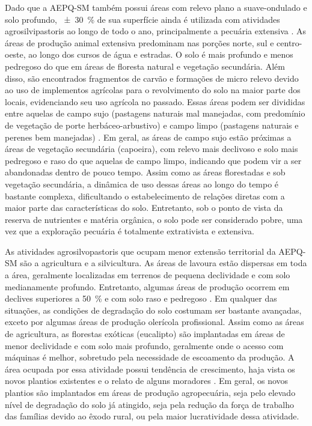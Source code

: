 Dado que a AEPQ-SM também possui áreas com relevo plano a suave-ondulado e solo profundo, 
\SI{\pm30}{\percent} de sua superfície ainda é utilizada com atividades agrosilvipastoris ao longo 
de todo o ano, principalmente a pecuária extensiva \citep{SamuelRosaEtAl2011a}. As áreas de produção
animal extensiva predominam nas porções norte, sul e centro-oeste, ao longo dos cursos de água e 
estradas. O solo é mais profundo e menos pedregoso do que em áreas de floresta natural e vegetação 
secundária. Além disso, são encontrados fragmentos de carvão e formações de micro relevo devido ao 
uso de implementos agrícolas para o revolvimento do solo na maior parte dos locais, evidenciando seu
uso agrícola no passado. Essas áreas podem ser divididas entre aquelas de campo sujo (pastagens 
naturais mal manejadas, com predomínio de vegetação de porte herbáceo-arbustivo) e campo limpo 
(pastagens naturais e perenes bem manejadas) \citep{SamuelRosaEtAl2011a}. Em geral, as áreas de 
campo sujo estão próximas a áreas de vegetação secundária (capoeira), com relevo mais declivoso e 
solo mais pedregoso e raso do que aquelas de campo limpo, indicando que podem vir a ser abandonadas 
dentro de pouco tempo. Assim como as áreas florestadas e sob vegetação secundária, a dinâmica de uso
dessas áreas ao longo do tempo é bastante complexa, dificultando o estabelecimento de relações 
diretas com a maior parte das características do solo. Entretanto, sob o ponto de vista da reserva 
de nutrientes e matéria orgânica, o solo pode ser considerado pobre, uma vez que a exploração 
pecuária é totalmente extrativista e extensiva.


As atividades agrosilvopastoris que ocupam menor extensão territorial da AEPQ-SM são a agricultura e
a silvicultura. As áreas de lavoura estão dispersas em toda a área, geralmente localizadas em 
terrenos de pequena declividade e com solo medianamente profundo. Entretanto, algumas áreas de 
produção ocorrem em declives superiores a \SI{50}{\percent} e com solo raso e pedregoso 
\citep{SamuelRosaEtAl2011a}. Em qualquer das situações, as condições de degradação do solo costumam 
ser bastante avançadas, exceto por algumas áreas de produção olerícola profissional. Assim como as 
áreas de agricultura, as florestas exóticas (eucalipto) são implantadas em áreas de menor 
declividade e com solo mais profundo, geralmente onde o acesso com máquinas é melhor, sobretudo pela
necessidade de escoamento da produção. A área ocupada por essa atividade possui tendência de 
crescimento, haja vista os novos plantios existentes e o relato de alguns moradores 
\citep{SamuelRosaEtAl2011a}. Em geral, os novos plantios são implantados em áreas de produção 
agropecuária, seja pelo elevado nível de degradação do solo já atingido, seja pela redução da força 
de trabalho das famílias devido ao êxodo rural, ou pela maior lucratividade dessa atividade.

